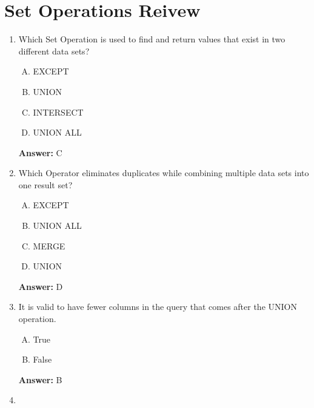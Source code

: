 \documentclass[12pt]{article}
\begin{document}
\bigskip

\section{Set Operations Reivew}

\bigskip


\begin{enumerate}[1.]
    \item

    Which Set Operation is used to find and return values that exist in two
    different data sets?

    \begin{enumerate}[A.]
        \item EXCEPT
        \item UNION
        \item INTERSECT
        \item UNION ALL
    \end{enumerate}

    \bigskip

    \textbf{Answer:} C

    \item

    Which Operator eliminates duplicates while combining multiple data sets into
    one result set?

    \begin{enumerate}[A.]
        \item EXCEPT
        \item UNION ALL
        \item MERGE
        \item UNION
    \end{enumerate}

    \bigskip

    \textbf{Answer:} D

    \item

    It is valid to have fewer columns in the query that comes after the UNION
    operation.

    \begin{enumerate}[A.]
        \item True
        \item False
    \end{enumerate}

    \bigskip

    \textbf{Answer:} B

    \item


\end{enumerate}
\end{document}
